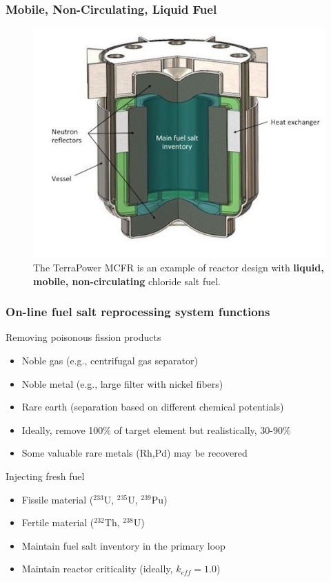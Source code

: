\documentclass[9pt]{beamer}
\begin{document}
\begin{frame}
\frametitle{Mobile, Non-Circulating, Liquid Fuel}
\begin{figure}[t]
	\vspace*{-0.09in}
	\hspace*{-0.35in}
	\includegraphics[height=0.6\textwidth]{./images/mcfr-crossection.jpg}
	\caption{The TerraPower MCFR is an example of reactor design with 
		\textbf{liquid, mobile, non-circulating} chloride salt fuel.}
\end{figure}   

\end{frame}

\begin{frame}
\frametitle{On-line fuel salt reprocessing system functions}
\begin{block}{Removing poisonous fission products}
	\begin{itemize}
		\item Noble gas (e.g., centrifugal gas separator)
		\item Noble metal (e.g., large filter with nickel fibers)
		\item Rare earth (separation based on different chemical potentials)
		\item Ideally, remove 100\% of target element but realistically, 
		30-90\%
		\item Some valuable rare metals (Rh,Pd) may be recovered %
	\end{itemize}
\end{block}

\begin{block}{Injecting fresh fuel}
	\begin{itemize}
		\item Fissile material ($^{233}$U, $^{235}$U, $^{239}$Pu)
		\item Fertile material ($^{232}$Th, $^{238}$U)
		\item Maintain fuel salt inventory in the primary loop
		\item Maintain reactor criticality (ideally, $k_{eff}=1.0$)
	\end{itemize}
\end{block}

\end{frame}
\end{document}
